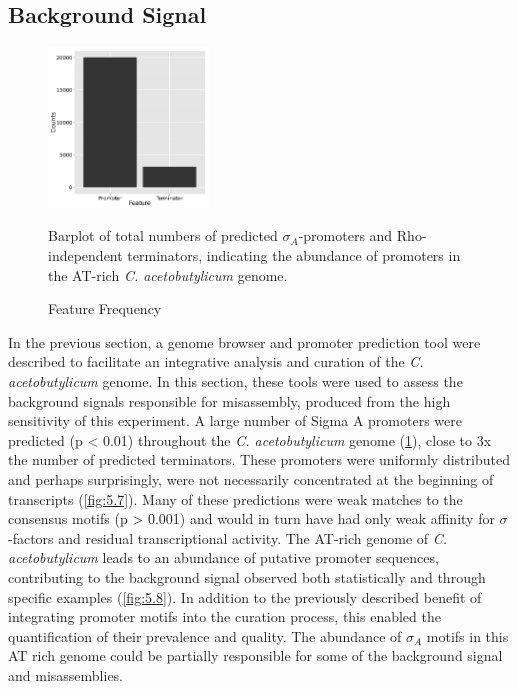 


\subsection{Background Signal}
\begin{figure}
\small
\vspace{-20pt}
\begin{center}
\includegraphics[width=0.38\textwidth]{images/Assembly/Background_signal/prediction_frequency.png}
\caption{Feature Frequency}\label{fig:5.6}
Barplot of total numbers of predicted $\sigma_{A}$-promoters and Rho-independent terminators, indicating the abundance of promoters in the AT-rich \textit{C. acetobutylicum} genome.
\end{center}
\vspace{-20pt}

\end{figure}

In the previous section, a genome browser and promoter prediction tool were described to facilitate an integrative analysis and curation of the \textit{C. acetobutylicum} genome. In this section, these tools were used to assess the background signals responsible for misassembly, produced from the high sensitivity of this experiment. A large number of Sigma A promoters were predicted (p < 0.01) throughout the \textit{C. acetobutylicum} genome (\ref{fig:5.6}), close to 3x the number of predicted terminators. These promoters were uniformly distributed and perhaps surprisingly, were not necessarily concentrated at the beginning of transcripts (\ref{fig:5.7}). Many of these predictions were weak matches to the consensus motifs (p > 0.001) and would in turn have had only weak affinity for $\sigma$-factors and residual transcriptional activity. The AT-rich genome of \textit{C. acetobutylicum} leads to an abundance of putative promoter sequences, contributing to the background signal observed both statistically and through specific examples (\ref{fig:5.8}). In addition to the previously described benefit of integrating promoter motifs into the curation process, this enabled the quantification of their prevalence and quality. The abundance of $\sigma_{A}$ motifs in this AT rich genome could be partially responsible for some of the background signal and misassemblies.

